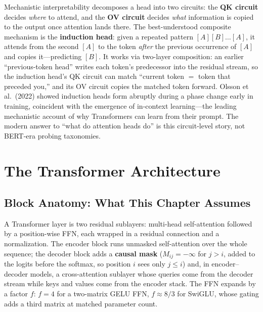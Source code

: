 \begin{keyinsight}
Mechanistic interpretability decomposes a head into two circuits: the \textbf{QK circuit} decides \textit{where} to attend, and the \textbf{OV circuit} decides \textit{what} information is copied to the output once attention lands there. The best-understood composite mechanism is the \textbf{induction head}: given a repeated pattern $[A][B] \ldots [A]$, it attends from the second $[A]$ to the token \textit{after} the previous occurrence of $[A]$ and copies it---predicting $[B]$. It works via two-layer composition: an earlier ``previous-token head'' writes each token's predecessor into the residual stream, so the induction head's QK circuit can match ``current token $=$ token that preceded you,'' and its OV circuit copies the matched token forward. Olsson et al.\ (2022) showed induction heads form abruptly during a phase change early in training, coincident with the emergence of in-context learning---the leading mechanistic account of why Transformers can learn from their prompt. The modern answer to ``what do attention heads do'' is this circuit-level story, not BERT-era probing taxonomies.
\end{keyinsight}

\section{The Transformer Architecture}
\label{sec:transformer_arch}

\subsection{Block Anatomy: What This Chapter Assumes}

A Transformer layer is two residual sublayers: multi-head self-attention followed by a position-wise FFN, each wrapped in a residual connection and a normalization. The encoder block runs unmasked self-attention over the whole sequence; the decoder block adds a \textbf{causal mask} ($M_{ij} = -\infty$ for $j > i$, added to the logits before the softmax, so position $i$ sees only $j \leq i$) and, in encoder--decoder models, a cross-attention sublayer whose queries come from the decoder stream while keys and values come from the encoder stack. The FFN expands by a factor $f$: $f = 4$ for a two-matrix GELU FFN, $f \approx 8/3$ for SwiGLU, whose gating adds a third matrix at matched parameter count.

